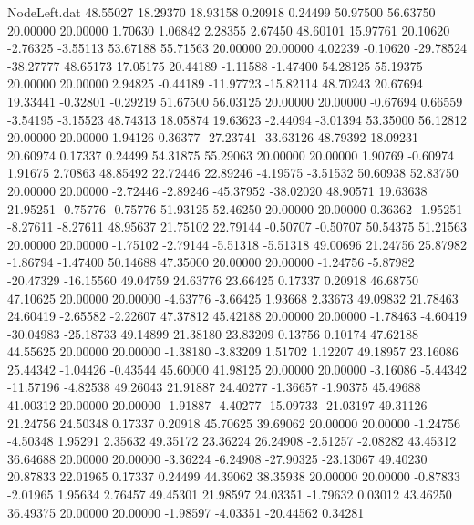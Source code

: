 \begin{filecontents}{NodeLeft.dat}
  48.55027   18.29370   18.93158     0.20918    0.24499   50.97500   56.63750   20.00000   20.00000    1.70630    1.06842    2.28355    2.67450
  48.60101   15.97761   20.10620    -2.76325   -3.55113   53.67188   55.71563   20.00000   20.00000    4.02239   -0.10620  -29.78524  -38.27777
  48.65173   17.05175   20.44189    -1.11588   -1.47400   54.28125   55.19375   20.00000   20.00000    2.94825   -0.44189  -11.97723  -15.82114
  48.70243   20.67694   19.33441    -0.32801   -0.29219   51.67500   56.03125   20.00000   20.00000   -0.67694    0.66559   -3.54195   -3.15523
  48.74313   18.05874   19.63623    -2.44094   -3.01394   53.35000   56.12812   20.00000   20.00000    1.94126    0.36377  -27.23741  -33.63126
  48.79392   18.09231   20.60974     0.17337    0.24499   54.31875   55.29063   20.00000   20.00000    1.90769   -0.60974    1.91675    2.70863
  48.85492   22.72446   22.89246    -4.19575   -3.51532   50.60938   52.83750   20.00000   20.00000   -2.72446   -2.89246  -45.37952  -38.02020
  48.90571   19.63638   21.95251    -0.75776   -0.75776   51.93125   52.46250   20.00000   20.00000    0.36362   -1.95251   -8.27611   -8.27611
  48.95637   21.75102   22.79144    -0.50707   -0.50707   50.54375   51.21563   20.00000   20.00000   -1.75102   -2.79144   -5.51318   -5.51318
  49.00696   21.24756   25.87982    -1.86794   -1.47400   50.14688   47.35000   20.00000   20.00000   -1.24756   -5.87982  -20.47329  -16.15560
  49.04759   24.63776   23.66425     0.17337    0.20918   46.68750   47.10625   20.00000   20.00000   -4.63776   -3.66425    1.93668    2.33673
  49.09832   21.78463   24.60419    -2.65582   -2.22607   47.37812   45.42188   20.00000   20.00000   -1.78463   -4.60419  -30.04983  -25.18733
  49.14899   21.38180   23.83209     0.13756    0.10174   47.62188   44.55625   20.00000   20.00000   -1.38180   -3.83209    1.51702    1.12207
  49.18957   23.16086   25.44342    -1.04426   -0.43544   45.60000   41.98125   20.00000   20.00000   -3.16086   -5.44342  -11.57196   -4.82538
  49.26043   21.91887   24.40277    -1.36657   -1.90375   45.49688   41.00312   20.00000   20.00000   -1.91887   -4.40277  -15.09733  -21.03197
  49.31126   21.24756   24.50348     0.17337    0.20918   45.70625   39.69062   20.00000   20.00000   -1.24756   -4.50348    1.95291    2.35632
  49.35172   23.36224   26.24908    -2.51257   -2.08282   43.45312   36.64688   20.00000   20.00000   -3.36224   -6.24908  -27.90325  -23.13067
  49.40230   20.87833   22.01965     0.17337    0.24499   44.39062   38.35938   20.00000   20.00000   -0.87833   -2.01965    1.95634    2.76457
  49.45301   21.98597   24.03351    -1.79632    0.03012   43.46250   36.49375   20.00000   20.00000   -1.98597   -4.03351  -20.44562    0.34281

\end{filecontents}
